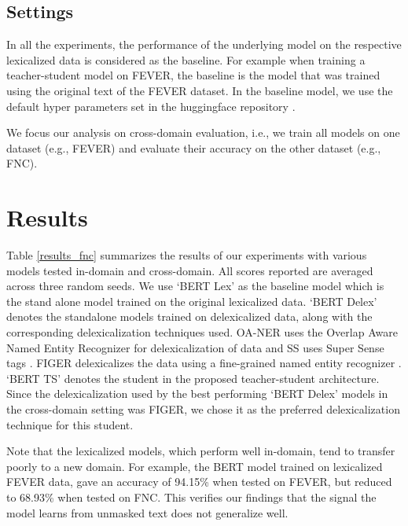 \subsection{Settings}


In all the experiments, the performance of the underlying model on the respective lexicalized data is considered as the baseline. For example when training a teacher-student model on FEVER, the baseline is the model that was trained using the original text of the FEVER dataset. In the baseline model, we use the default hyper parameters set in the huggingface repository \citep{wolf2019huggingface}.


We focus our analysis on cross-domain evaluation, i.e., we train all models on one dataset  (e.g., FEVER) and evaluate their accuracy on the other dataset (e.g., FNC).



\section{Results}
Table \ref{results_fnc} summarizes the results of our experiments with various models tested in-domain and cross-domain. All scores reported are averaged across three random seeds. We use `BERT Lex' as the baseline model which is the stand alone model trained on the original lexicalized data. `BERT Delex' denotes the standalone models trained on delexicalized data, along with the corresponding delexicalization techniques used. OA-NER uses the Overlap Aware Named Entity Recognizer for delexicalization of data and SS uses Super Sense tags \citep{suntwal-etal-2019-importance}. FIGER delexicalizes the data using a fine-grained named entity recognizer \citep{ling2012fine}.  `BERT TS' denotes the student in the proposed teacher-student architecture.  Since the delexicalization used by the best performing `BERT Delex' models in the cross-domain setting was FIGER, we chose it as the preferred delexicalization technique for this student.

Note that the lexicalized models, which perform well in-domain, tend to transfer poorly to a new domain. For example, the BERT model trained
on lexicalized FEVER data, gave an accuracy of 94.15\% when tested on FEVER, but reduced to 68.93\% when tested on FNC.
This verifies our findings that the signal the model learns from unmasked text does not generalize well.

